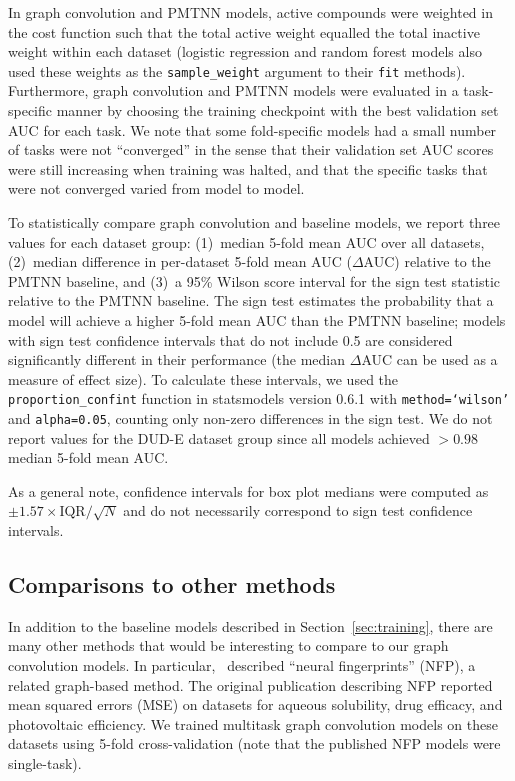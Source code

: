 In graph convolution and PMTNN models, active compounds were weighted in the
cost function such that the total active weight equalled the total inactive
weight within each dataset (logistic regression and random forest models also
used these weights as the \texttt{sample\_weight} argument to their \texttt{fit}
methods). Furthermore, graph convolution and PMTNN models were evaluated in a
task-specific manner by choosing the training checkpoint with the best
validation set AUC for each task. We note that some fold-specific models had a
small number of tasks were not ``converged'' in the sense that their validation
set AUC scores were still increasing when training was halted, and that the
specific tasks that were not converged varied from model to model.

To statistically compare graph convolution and baseline models, we report three
values for each dataset group: (1)~median 5-fold mean AUC over all datasets,
(2)~median difference in per-dataset 5-fold mean AUC ($\Delta$AUC) relative to
the PMTNN baseline, and (3)~a 95\% Wilson score interval for the sign test
statistic relative to the PMTNN baseline. The sign test estimates the
probability that a model will achieve a higher 5-fold mean AUC than the PMTNN
baseline; models with sign test confidence intervals that do not include 0.5
are considered significantly different in their performance (the median
$\Delta$AUC can be used as a measure of effect size). To calculate these
intervals, we used the \texttt{proportion\_confint} function in statsmodels
\citep{seabold2010statsmodels} version 0.6.1 with \texttt{method=`wilson'} and
\texttt{alpha=0.05}, counting only non-zero differences in the sign test.  We do
not report values for the DUD-E dataset group since all models achieved $>0.98$
median 5-fold mean AUC.

As a general note, confidence intervals for box plot medians were computed as
${\pm 1.57 \times \text{IQR} / \sqrt{N}}$ \citep{mcgill1978variations} and do
not necessarily correspond to sign test confidence intervals.

\subsection{Comparisons to other methods}
\label{sec:other_comparisons}

In addition to the baseline models described in Section~\ref{sec:training},
there are many other methods that would be interesting to compare to our graph
convolution models. In particular,~\citet{duvenaud2015convolutional} described
``neural fingerprints'' (NFP), a related graph-based method. The original
publication describing NFP reported mean squared errors (MSE) on datasets for
aqueous solubility, drug efficacy, and photovoltaic efficiency. We trained
multitask graph convolution models on these datasets using 5-fold
cross-validation (note that the published NFP models were single-task).

